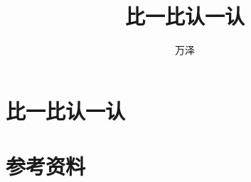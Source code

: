 \documentclass[12pt]{exam}%
\begin{document}
\begin{coverpages}
\title{比一比认一认}
\author{万泽}
\maketitle
\begin{abstract}

\end{abstract}
\tableofcontents
\end{coverpages}


\section{比一比认一认}




\section{参考资料}
\end{document}
